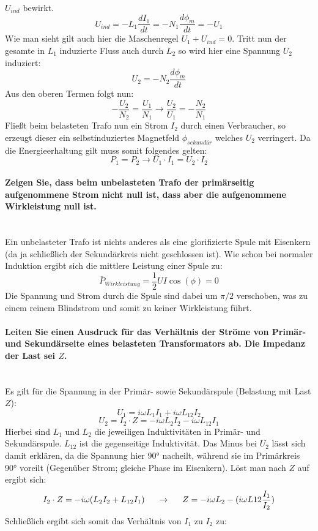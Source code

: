 \documentclass[a4paper, 11pt, parskip=half]{scrartcl}
\newcommand{\myparagraph}[1]{\paragraph{#1}\mbox{}\\}
\begin{document}
$U_{ind}$ bewirkt. 
\[U_{ind} = - L_1 \frac{d I_1}{d t} = -N_1 \frac{d \phi_m}{d t} = -U_1\]
Wie man sieht gilt auch hier die Maschenregel $U_1 + U_{ind} = 0$. 
Tritt nun der gesamte in $L_1$ induzierte Fluss auch durch $L_2$ so wird hier eine Spannung $U_2$ induziert:
\[U_2 = -N_2 \frac{d \phi_m}{d t}\]
Aus den oberen Termen folgt nun:
\begin{equation}
    - \frac{U_2}{N_2} = \frac{U_1}{N_1} \rightarrow \frac{U_2}{U_1} = - \frac{N_2}{N_1} 
\end{equation}
Fließt beim belasteten Trafo nun ein Strom $I_2$ durch einen Verbraucher, so erzeugt dieser ein selbstinduziertes Magnetfeld $\phi_{sekundär}$
welches $U_2$ verringert. Da die Energieerhaltung gilt muss somit folgendes gelten:
\[P_1 = P_2 \rightarrow U_1 \cdot I_1 = U_2 \cdot I_2\]
\myparagraph{Zeigen Sie, dass beim unbelasteten Trafo der primärseitig aufgenommene Strom nicht null
ist, dass aber die aufgenommene Wirkleistung null ist.}
Ein unbelasteter Trafo ist nichts anderes als eine glorifizierte Spule mit Eisenkern (da ja schließlich der Sekundärkreis nicht geschlossen ist).
Wie schon bei normaler Induktion ergibt sich die mittlere Leistung einer Spule zu:
\begin{equation}
    \bar{P}_{Wirkleistung} = \frac{1}{2} U I \cos(\phi) = 0
\end{equation}
Die Spannung und Strom durch die Spule sind dabei um $\pi/2$ verschoben, was zu einem reinem Blindstrom und somit zu keiner Wirkleistung führt.
\myparagraph{Leiten Sie einen Ausdruck für das Verhältnis der Ströme von Primär- und Sekundärseite
eines belasteten Transformators ab. Die Impedanz der Last sei $Z$.}
Es gilt für die Spannung in der Primär- sowie Sekundärspule (Belastung mit Last $Z$):
\[U_1 = i\omega L_1 I_1 + i\omega L_{12} I_2\]
\[U_2 = I_2 \cdot Z = -i \omega L_2 I_2 - i \omega L_{12} I_1\]
Hierbei sind $L_1$ und $L_2$ die jeweiligen Induktivitäten in Primär- und Sekundärspule. $L_{12}$ ist die gegenseitige Induktivität.
Das Minus bei $U_2$ lässt sich damit erklären, da die Spannung hier 90° nacheilt, während sie im Primärkreis 90° voreilt (Gegenüber Strom; gleiche Phase im Eisenkern).
Löst man nach $Z$ auf ergibt sich:
\begin{equation}
    I_2 \cdot Z = -i \omega(L_2 I_2 + L_{12} I_1) \hspace{5mm} \rightarrow \hspace{5mm} Z = -i \omega L_2 - (i \omega L{12} \frac{I_1}{I_2})
\end{equation}
Schließlich ergibt sich somit das Verhältnis von $I_1$ zu $I_2$ zu:
\end{document}

